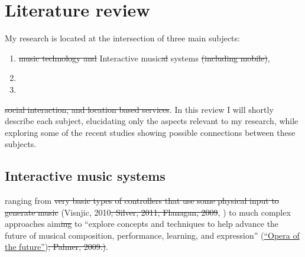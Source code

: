 \section{Literature review}

My research is located at the intersection of three main subjects:
\begin{enumerate}
	\item \st{music technology and} Interactive music\st{al} systems\st{ (including mobile)},
	\item {}
	\item {}
\end{enumerate}
\st{social interaction, and location based services}. In this review I will shortly describe each subject, elucidating only the aspects relevant to my research, while exploring some of the recent studies showing possible connections between these subjects. 

\subsection{Interactive music systems}


 ranging from  \st{very basic types of controllers that use some physical input to generate music} (Visnjic, 2010\st{; Silver, 2011; Flanagan, 2009}, \href{http://createdigitalmusic.com/2012/10/at-musicmakers-experiencing-music-through-design-as-community-of-doers-collaborates-listen-watch/}{}) to much complex approaches  aim\st{ing} to ``explore concepts and techniques to help advance the future of musical composition, performance, learning, and expression'' (\href{http://www.media.mit.edu/research/groups/opera-future}{``Opera of the future''})\st{; Palmer, 2009.)}.

